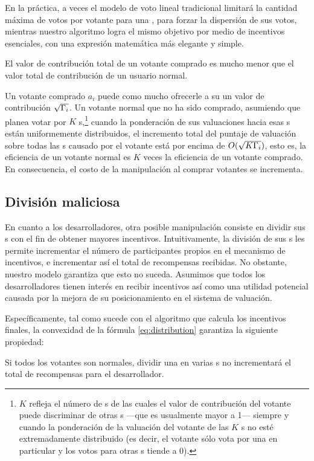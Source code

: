 En la práctica, a veces el modelo de voto lineal tradicional limitará la cantidad máxima de votos por votante para una \dapp, para forzar la dispersión de sus votos, mientras nuestro algoritmo logra el mismo objetivo por medio de incentivos esenciales, con una expresión matemática más elegante y simple.


\begin{corollary}
	El valor de contribución total de un votante comprado es mucho menor que el valor total de contribución de un usuario normal.
\end{corollary}
Un votante comprado $a_i$ puede como mucho ofrecerle a su \dapp un valor de contribución $\sqrt{\Gamma_i}$. Un votante normal que no ha sido comprado, asumiendo que planea votar por $K$ {\dapp}s,\footnote{$K$ refleja el número de {\dapp}s de las cuales el valor de contribución del votante puede discriminar de otras {\dapp}s —que es usualmente mayor a 1— siempre y cuando la ponderación de la valuación del votante de las $K$ {\dapp}s no esté extremadamente distribuido (es decir, el votante sólo vota por una \dapp en particular y los votos para otras {\dapp}s tiende a 0).} cuando la ponderación de sus valuaciones hacia esas {\dapp}s están uniformemente distribuidos, el incremento total del puntaje de valuación sobre todas las {\dapp}s causado por el votante está por encima de $O(\sqrt{K\Gamma_i})$, esto es, la eficiencia de un votante normal es $K$ veces la eficiencia de un votante comprado. En consecuencia, el costo de la manipulación al comprar votantes se incrementa.

\subsection{División maliciosa}
\label{subsec:5.2}
\noindent En cuanto a los desarrolladores, otra posible manipulación consiste en dividir sus {\dapp}s con el fin de obtener mayores incentivos. Intuitivamente, la división de sus {\dapp}s les permite incrementar el número de participantes propios en el mecanismo de incentivos, e incrementar así el total de recompensas recibidas. No obstante, nuestro modelo garantiza que esto no suceda. Asumimos que todos los desarrolladores tienen interés en recibir incentivos así como una utilidad potencial causada por la mejora de su posicionamiento en el sistema de valuación.

Específicamente, tal como sucede con el algoritmo que calcula los incentivos finales, la convexidad de la fórmula \ref{eq:distribution} garantiza la siguiente propiedad:
\begin{property}
	\label{p2}
    Si todos los votantes son normales, dividir una \dapp en varias {\dapp}s no incrementará el total de recompensas para el desarrollador.
\end{property}

